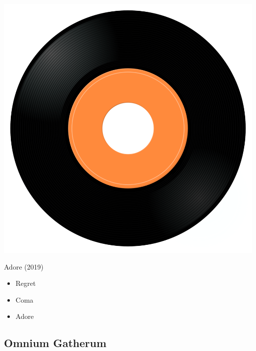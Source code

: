 \begin{minipage}[t]{0.25\textwidth}\vspace{0pt}
\captionsetup{type=figure}
\includegraphics[width=\textwidth]{Images/cover.png}
\caption*{Adore (2019)}
\end{minipage}
\begin{minipage}[t]{0.25\textwidth}\vspace{0pt}
\begin{itemize}[nosep,leftmargin=1em,labelwidth=*,align=left]
	\setlength{\itemsep}{0pt}
	\item Regret
	\item Coma
	\item Adore
\end{itemize}
\end{minipage}

\subsection{Omnium Gatherum}


